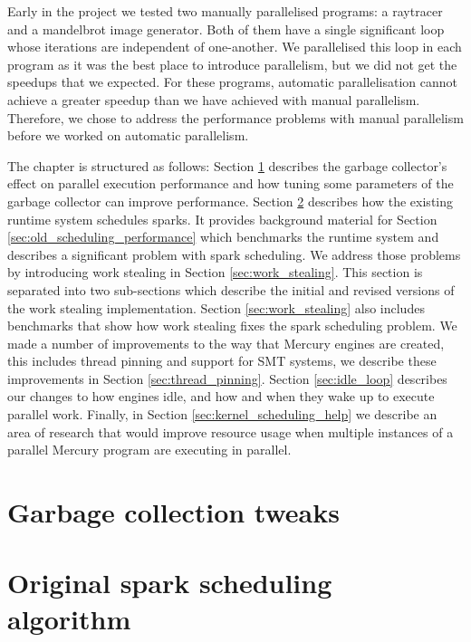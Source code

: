 

Early in the project
we tested two manually parallelised programs:
a raytracer and a mandelbrot image generator.
Both of them have a single significant loop
whose iterations are independent of one-another.
We parallelised this loop in each program as it was the best place to
introduce parallelism,
but we did not get the speedups that we expected.
For these programs, automatic parallelisation cannot achieve
a greater speedup than we have achieved with manual parallelism.
Therefore,
we chose to address the performance problems with manual parallelism
before we worked on automatic parallelism.

The chapter is structured as follows:
Section \ref{sec:gc} describes the garbage collector's effect on parallel
execution performance and how tuning some parameters of the garbage
collector can improve performance.
Section \ref{sec:old_scheduling} describes how the existing runtime
system schedules sparks.
It provides background material for Section
\ref{sec:old_scheduling_performance}
which benchmarks the runtime system and describes a significant problem with
spark scheduling.
We address those problems by introducing work stealing in Section
\ref{sec:work_stealing}.
This section is separated into two sub-sections
which describe the initial and revised versions of the work stealing
implementation.
Section \ref{sec:work_stealing} also includes benchmarks that show
how work stealing fixes the spark scheduling problem.
We made a number of improvements to the way that Mercury engines are created,
this includes thread pinning and support for SMT systems,
we describe these improvements in Section \ref{sec:thread_pinning}.
Section \ref{sec:idle_loop} describes our changes to how engines idle,
and how and when they wake up to execute parallel work.
Finally, in Section \ref{sec:kernel_scheduling_help}
we describe an area of research that would improve resource usage when
multiple instances of a parallel Mercury program are executing in parallel.

\section{Garbage collection tweaks}
\label{sec:gc}




\section{Original spark scheduling algorithm}
\label{sec:old_scheduling}

